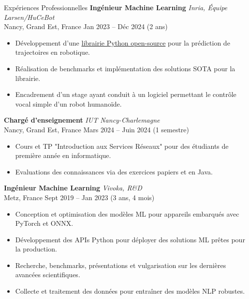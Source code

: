 \documentclass{resume} %
\begin{document}
\begin{rSection}{Expériences Professionnelles}
\textbf{Ingénieur Machine Learning} \hfill \textit{Inria, Équipe Larsen/HuCeBot} \\
Nancy, Grand Est, France \hfill Jan 2023 -- Déc 2024 (2 ans)
\begin{itemize}
    \item Développement d'une \href{https://github.com/hucebot/prescyent}{librairie Python open-source} pour la prédiction de trajectoires en robotique.
    \item Réalisation de benchmarks et implémentation des solutions SOTA pour la librairie.
    \item Encadrement d’un stage ayant conduit à un logiciel permettant le contrôle vocal simple d’un robot humanoïde.
\end{itemize}

\vspace{0.2cm}

\textbf{Chargé d'enseignement} \hfill \textit{IUT Nancy-Charlemagne} \\
Nancy, Grand Est, France \hfill Mars 2024 -- Juin 2024 (1 semestre)
\begin{itemize}
    \item Cours et TP "Introduction aux Services Réseaux" pour des étudiants de première année en informatique.
    \item Evaluations des connaissances via des exercices papiers et en Java.
\end{itemize}

\vspace{0.2cm}

\textbf{Ingénieur Machine Learning} \hfill \textit{Vivoka, R\&D} \\
Metz, France \hfill Sept 2019 -- Jan 2023 (3 ans, 4 mois)
\begin{itemize}
    \item Conception et optimisation des modèles ML pour appareils embarqués avec PyTorch et ONNX.
    \item Développement des APIs Python pour déployer des solutions ML prêtes pour la production.
    \item Recherche, benchmarks, présentations et vulgarisation sur les dernières avancées scientifiques.
    \item Collecte et traitement des données pour entraîner des modèles NLP robustes.
\end{itemize}


\end{rSection}
\end{document}
